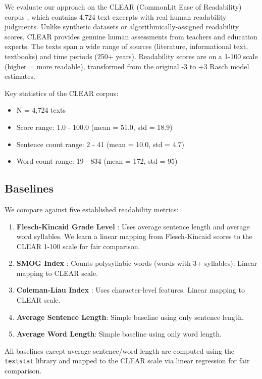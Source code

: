 \documentclass[11pt,letterpaper]{article}
\begin{document}
We evaluate our approach on the CLEAR (CommonLit Ease of Readability) corpus \cite{Crossley2021}, which contains 4,724 text excerpts with real human readability judgments. Unlike synthetic datasets or algorithmically-assigned readability scores, CLEAR provides genuine human assessments from teachers and education experts. The texts span a wide range of sources (literature, informational text, textbooks) and time periods (250+ years). Readability scores are on a 1-100 scale (higher = more readable), transformed from the original -3 to +3 Rasch model estimates.

Key statistics of the CLEAR corpus:
\begin{itemize}
    \item N = 4,724 texts
    \item Score range: 1.0 - 100.0 (mean = 51.0, std = 18.9)
    \item Sentence count range: 2 - 41 (mean = 10.0, std = 4.7)
    \item Word count range: 19 - 834 (mean = 172, std = 95)
\end{itemize}

\subsection{Baselines}

We compare against five established readability metrics:

\begin{enumerate}
    \item \textbf{Flesch-Kincaid Grade Level} \cite{Kincaid1975}: Uses average sentence length and average word syllables. We learn a linear mapping from Flesch-Kincaid scores to the CLEAR 1-100 scale for fair comparison.
    \item \textbf{SMOG Index} \cite{McLaughlin1969}: Counts polysyllabic words (words with 3+ syllables). Linear mapping to CLEAR scale.
    \item \textbf{Coleman-Liau Index} \cite{Coleman1975}: Uses character-level features. Linear mapping to CLEAR scale.
    \item \textbf{Average Sentence Length}: Simple baseline using only sentence length.
    \item \textbf{Average Word Length}: Simple baseline using only word length.
\end{enumerate}

All baselines except average sentence/word length are computed using the \texttt{textstat} library and mapped to the CLEAR scale via linear regression for fair comparison.
\end{document}
